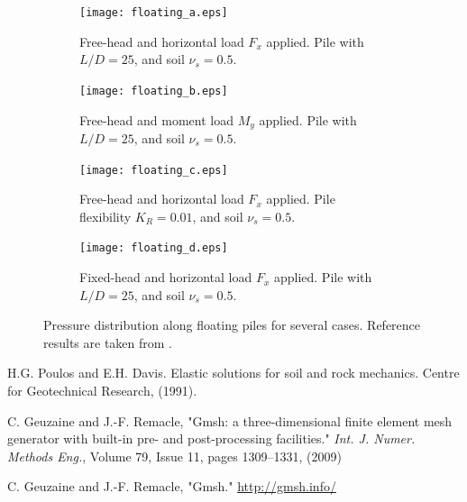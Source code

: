 \documentclass[a4]{article}
\begin{document}
\begin{figure}[tbh!]
	\centering
	\begin{subfigure}[b]{0.48\textwidth}
		\centering
		\texttt{[image: floating\_a.eps]}
		\caption{Free-head and horizontal load $F_x$ applied. Pile with $L/D=25$, and soil $\nu_s=0.5$.}
		\label{fig:floating_results_a}
	\end{subfigure}
	\begin{subfigure}[b]{0.48\textwidth}
		\centering
		\texttt{[image: floating\_b.eps]}
		\caption{Free-head and moment load $M_y$ applied. Pile with $L/D=25$, and soil $\nu_s=0.5$.}
		\label{fig:floating_results_b}
	\end{subfigure}
	\begin{subfigure}[b]{0.48\textwidth}
		\centering
		\texttt{[image: floating\_c.eps]}
		\caption{Free-head and horizontal load $F_x$ applied. Pile flexibility $K_R=0.01$, and soil $\nu_s=0.5$.}
		\label{fig:floating_results_c}
	\end{subfigure}
	\begin{subfigure}[b]{0.48\textwidth}
		\centering
		\texttt{[image: floating\_d.eps]}
		\caption{Fixed-head and horizontal load $F_x$ applied. Pile with $L/D=25$, and soil $\nu_s=0.5$.}
		\label{fig:floating_results_d}
	\end{subfigure}    
	\caption{Pressure distribution along floating piles for several  cases. Reference results are taken from \cite{poulos}.}
	\label{fig:results}
\end{figure}

\begin{thebibliography}{99}
	
	 H.G. Poulos and E.H. Davis. Elastic solutions for soil and rock mechanics. Centre	for Geotechnical Research, (1991).

	 C. Geuzaine and J.-F. Remacle, "Gmsh: a three-dimensional finite element mesh generator with built-in pre- and post-processing facilities." \emph{Int. J. Numer. Methods Eng.}, Volume 79, Issue 11, pages 1309--1331, (2009)
	
	 C. Geuzaine and J.-F. Remacle, "Gmsh." \url{http://gmsh.info/}

\end{thebibliography}
\end{document}
